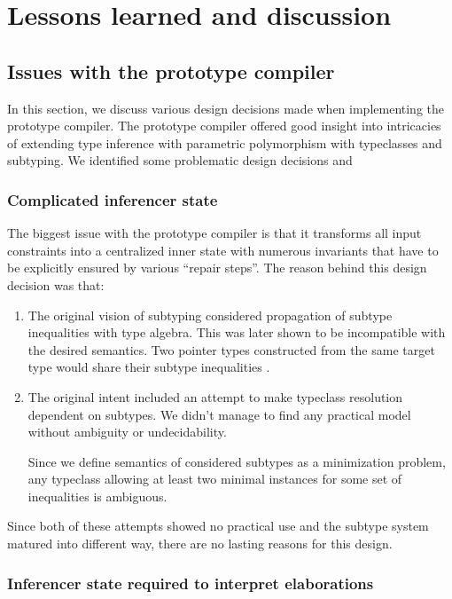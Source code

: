\chapter{Lessons learned and discussion}
\label{chap5}

\section{Issues with the prototype compiler}

In this section, we discuss various design decisions made when implementing the prototype compiler. The prototype compiler offered good insight into intricacies of extending type inference with parametric polymorphism with typeclasses and subtyping. We identified some problematic design decisions and

\subsection{Complicated inferencer state}
\label{sec:state}

The biggest issue with the prototype compiler is that it transforms all input constraints into a centralized inner state with numerous invariants that have to be explicitly ensured by various ``repair steps''. The reason behind this design decision was that:

\begin{enumerate}
    \item The original vision of subtyping considered propagation of subtype inequalities with type algebra. This was later shown to be incompatible with the desired semantics. Two pointer types constructed from the same target type would share their subtype inequalities .

    \item The original intent included an attempt to make typeclass resolution dependent on subtypes. We didn't manage to find any practical model without ambiguity or undecidability.

    Since we define semantics of considered subtypes as a minimization problem, any typeclass allowing at least two minimal instances for some set of inequalities is ambiguous.
\end{enumerate}

Since both of these attempts showed no practical use and the subtype system matured into different way, there are no lasting reasons for this design.

\subsection{Inferencer state required to interpret elaborations}
\label{sec:inferInter}

